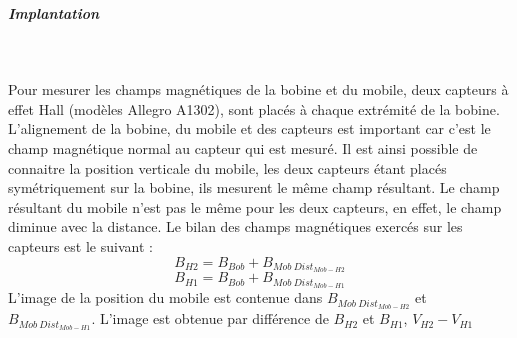 \documentclass[11pt, french]{article} %
\begin{document}
\subparagraph*{Implantation}~\\
\begin{minipage}[t]{10cm}
Pour mesurer les champs magnétiques de la bobine et du mobile, deux capteurs à effet Hall (modèles Allegro A1302), sont placés à chaque extrémité de la bobine. L'alignement de la bobine, du mobile et des capteurs est important car c'est le champ magnétique normal au capteur qui est mesuré. Il est ainsi possible de connaitre la position verticale du mobile, les deux capteurs étant placés symétriquement sur la bobine, ils mesurent le même champ résultant. Le champ résultant du mobile n'est pas le même pour les deux capteurs, en effet, le champ diminue avec la distance. Le bilan des champs magnétiques exercés sur les capteurs est le suivant :
\vspace{-0.3cm} \[B_{H2} = B_{Bob} + B_{Mob~Dist_{Mob-H2}}\]
\vspace{-0.8cm} \[B_{H1} = B_{Bob} + B_{Mob~Dist_{Mob-H1}}\]
L'image de la position du mobile est contenue dans  $B_{Mob~Dist_{Mob-H2}}$ et $B_{Mob~Dist_{Mob-H1}}$. L'image est obtenue par différence de $B_{H2}$ et $B_{H1}$, $V_{H2}-V_{H1}$
\end{minipage}
~
\begin{minipage}[t]{8cm}
\vspace{-7cm}
\end{minipage}
\end{document}

